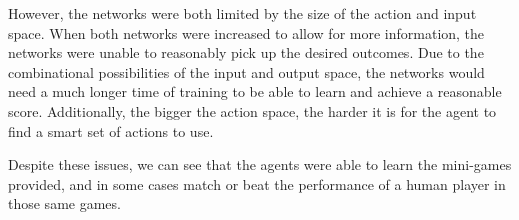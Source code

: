 However, the networks were both limited by the size of the action and input
space. When both networks were increased to allow for more information, the
networks were unable to reasonably pick up the desired outcomes. Due to the
combinational possibilities of the input and output space, the networks would
need a much longer time of training to be able to learn and achieve a reasonable
score. Additionally, the bigger the action space, the harder it is for the agent
to find a smart set of actions to use.

Despite these issues, we can see that the agents were able to learn the
mini-games provided, and in some cases match or beat the performance of a human
player in those same games.
